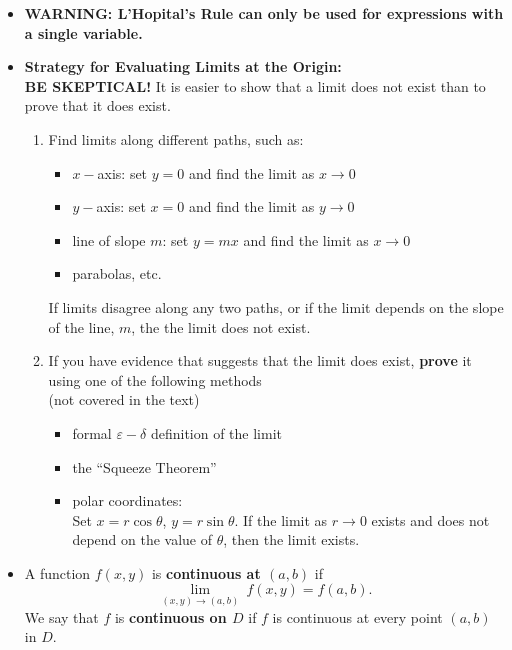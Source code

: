 \begin{itemize}

\item \textbf{WARNING: L'Hopital's Rule can only be used for expressions with a single variable.}

\item \textbf{Strategy for Evaluating Limits at the Origin:}\\
\textbf{BE SKEPTICAL!} It is easier to show that a limit does not exist than to prove that it does exist.

\begin{enumerate}
\item Find  limits along different paths, such as:
\begin{itemize}
\item \(x-\)axis: set \(y=0\) and find the limit as \(x\rightarrow 0\)
\item \(y-\)axis: set \(x=0\) and find the limit as \(y\rightarrow 0\)
\item line of slope \(m\): set \(y=mx\) and find the limit as \(x\rightarrow 0\)
\item parabolas, etc.

\end{itemize}
If limits disagree along any two paths, or if the limit depends on the slope of the line, \(m\), the the limit does not exist.

\item If you have evidence that suggests that the limit does exist, \textbf{prove} it using one of the following methods\\
 (not covered in the text)
\begin{itemize}
\item formal \(\varepsilon-\delta\) definition of the limit %
\item the ``Squeeze Theorem''
\item polar coordinates:\\
Set \(x=r \cos\theta\), \(y=r\sin\theta\). If the limit as \(r\rightarrow0\) exists and does not depend on the value of \(\theta\), then the limit exists.
\end{itemize}
\end{enumerate}



\item A function \(f(x,y)\) is \textbf{continuous at \((a,b)\)} if
\[\lim_{(x,y)\rightarrow (a,b)}\ f(x,y) = f(a,b).\]
We say that \(f\) is \textbf{continuous on \(D\)} if \(f\) is continuous at every point \((a,b)\) in \(D\).



\end{itemize}

